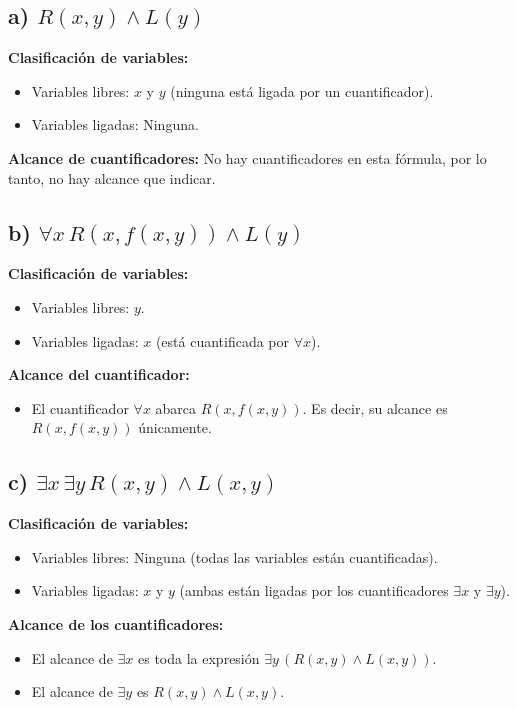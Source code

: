 \documentclass[11pt,letterpaper]{article}
\begin{document}
\subsection*{a) \( R(x, y) \land L(y) \)}

\textbf{Clasificación de variables:}
\begin{itemize}
    \item Variables libres: \( x \) y \( y \) (ninguna está ligada por un cuantificador).
    \item Variables ligadas: Ninguna.
\end{itemize}

\textbf{Alcance de cuantificadores:} No hay cuantificadores en esta fórmula, por lo tanto, no hay alcance que indicar.

\subsection*{b) \( \forall x \, R(x, f(x, y)) \land L(y) \)}

\textbf{Clasificación de variables:}
\begin{itemize}
    \item Variables libres: \( y \).
    \item Variables ligadas: \( x \) (está cuantificada por \( \forall x \)).
\end{itemize}

\textbf{Alcance del cuantificador:}
\begin{itemize}
    \item El cuantificador \( \forall x \) abarca \( R(x, f(x, y)) \). Es decir, su alcance es \( R(x, f(x, y)) \) únicamente.
\end{itemize}

\subsection*{c) \( \exists x \, \exists y \, R(x, y) \land L(x, y) \)}

\textbf{Clasificación de variables:}
\begin{itemize}
    \item Variables libres: Ninguna (todas las variables están cuantificadas).
    \item Variables ligadas: \( x \) y \( y \) (ambas están ligadas por los cuantificadores \( \exists x \) y \( \exists y \)).
\end{itemize}

\textbf{Alcance de los cuantificadores:}
\begin{itemize}
    \item El alcance de \( \exists x \) es toda la expresión \( \exists y \, (R(x, y) \land L(x, y)) \).
    \item El alcance de \( \exists y \) es \( R(x, y) \land L(x, y) \).
\end{itemize}
\end{document}
